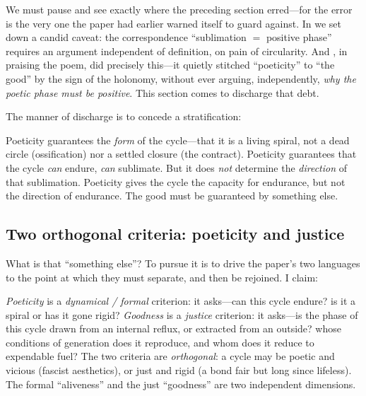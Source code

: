 We must pause and see exactly where the preceding section erred---for the error is the very one the paper had earlier warned itself to guard against. In  we set down a candid caveat: the correspondence ``sublimation $=$ positive phase'' requires an argument independent of definition, on pain of circularity. And , in praising the poem, did precisely this---it quietly stitched ``poeticity'' to ``the good'' by the sign of the holonomy, without ever arguing, independently, \emph{why the poetic phase must be positive}. This section comes to discharge that debt.

The manner of discharge is to concede a stratification:

\begin{claim}
Poeticity guarantees the \emph{form} of the cycle---that it is a living spiral, not a dead circle (ossification) nor a settled closure (the contract). Poeticity guarantees that the cycle \emph{can} endure, \emph{can} sublimate. But it does \emph{not} determine the \emph{direction} of that sublimation. Poeticity gives the cycle the capacity for endurance, but not the direction of endurance. The good must be guaranteed by something else.
\end{claim}

\subsection{Two orthogonal criteria: poeticity and justice}
\label{p09:sec:orthogonal}

What is that ``something else''? To pursue it is to drive the paper's two languages to the point at which they must separate, and then be rejoined. I claim:

\begin{claim}
\emph{Poeticity} is a \emph{dynamical / formal} criterion: it asks---can this cycle endure? is it a spiral or has it gone rigid? \emph{Goodness} is a \emph{justice} criterion: it asks---is the phase of this cycle drawn from an internal reflux, or extracted from an outside? whose conditions of generation does it reproduce, and whom does it reduce to expendable fuel? The two criteria are \emph{orthogonal}: a cycle may be poetic and vicious (fascist aesthetics), or just and rigid (a bond fair but long since lifeless). The formal ``aliveness'' and the just ``goodness'' are two independent dimensions.
\end{claim}

